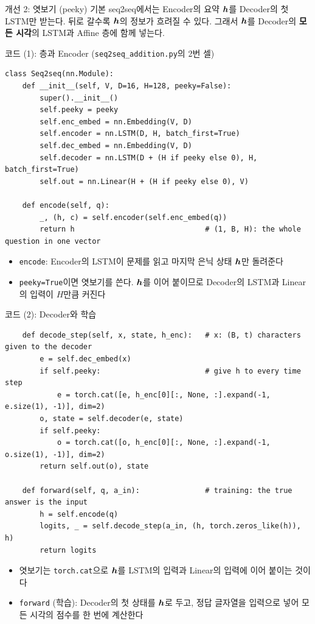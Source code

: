 \documentclass[aspectratio=169,11pt]{beamer}
\begin{document}
\begin{frame}{개선 2: 엿보기 (peeky)}
기본 seq2seq에서는 Encoder의 요약 $\bm{h}$를 Decoder의 첫 LSTM만 받는다.
뒤로 갈수록 $\bm{h}$의 정보가 흐려질 수 있다.
그래서 $\bm{h}$를 Decoder의 \textbf{모든 시각}의 LSTM과 Affine 층에 함께 넣는다.
\end{frame}

\begin{frame}[fragile]{코드 (1): 층과 Encoder (\texttt{seq2seq\_addition.py}의 2번 셀)}
\begin{lstlisting}
class Seq2seq(nn.Module):
    def __init__(self, V, D=16, H=128, peeky=False):
        super().__init__()
        self.peeky = peeky
        self.enc_embed = nn.Embedding(V, D)
        self.encoder = nn.LSTM(D, H, batch_first=True)
        self.dec_embed = nn.Embedding(V, D)
        self.decoder = nn.LSTM(D + (H if peeky else 0), H, batch_first=True)
        self.out = nn.Linear(H + (H if peeky else 0), V)

    def encode(self, q):
        _, (h, c) = self.encoder(self.enc_embed(q))
        return h                              # (1, B, H): the whole question in one vector
\end{lstlisting}
\begin{itemize}
\item \texttt{encode}: Encoder의 LSTM이 문제를 읽고 마지막 은닉 상태 $\bm{h}$만 돌려준다
\item \texttt{peeky=True}이면 엿보기를 쓴다.
$\bm{h}$를 이어 붙이므로 Decoder의 LSTM과 Linear의 입력이 $H$만큼 커진다
\end{itemize}
\end{frame}

\begin{frame}[fragile]{코드 (2): Decoder와 학습}
\begin{lstlisting}
    def decode_step(self, x, state, h_enc):   # x: (B, t) characters given to the decoder
        e = self.dec_embed(x)
        if self.peeky:                        # give h to every time step
            e = torch.cat([e, h_enc[0][:, None, :].expand(-1, e.size(1), -1)], dim=2)
        o, state = self.decoder(e, state)
        if self.peeky:
            o = torch.cat([o, h_enc[0][:, None, :].expand(-1, o.size(1), -1)], dim=2)
        return self.out(o), state

    def forward(self, q, a_in):               # training: the true answer is the input
        h = self.encode(q)
        logits, _ = self.decode_step(a_in, (h, torch.zeros_like(h)), h)
        return logits
\end{lstlisting}
\begin{itemize}
\item 엿보기는 \texttt{torch.cat}으로 $\bm{h}$를 LSTM의 입력과 Linear의 입력에 이어 붙이는 것이다
\item \texttt{forward} (학습): Decoder의 첫 상태를 $\bm{h}$로 두고,
정답 글자열을 입력으로 넣어 모든 시각의 점수를 한 번에 계산한다
\end{itemize}
\end{frame}
\end{document}
